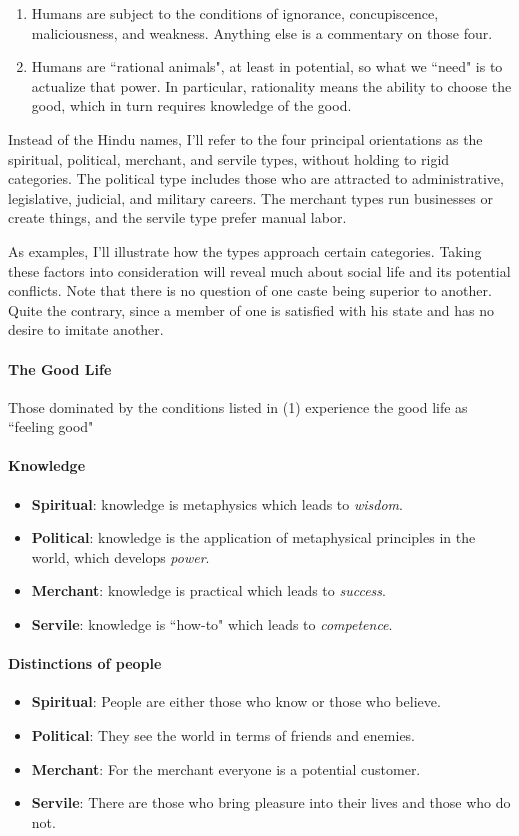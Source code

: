 \begin{enumerate}
\item Humans are subject to the conditions of ignorance, concupiscence, maliciousness, and weakness. Anything else is a commentary on those four. 
\item Humans are ``rational animals", at least in potential, so what we ``need" is to actualize that power. In particular, rationality means the ability to choose the good, which in turn requires knowledge of the good. 
\end{enumerate}
Instead of the Hindu names, I'll refer to the four principal orientations as the spiritual, political, merchant, and servile types, without holding to rigid categories. The political type includes those who are attracted to administrative, legislative, judicial, and military careers. The merchant types run businesses or create things, and the servile type prefer manual labor.

As examples, I'll illustrate how the types approach certain categories. Taking these factors into consideration will reveal much about social life and its potential conflicts. Note that there is no question of one caste being superior to another. Quite the contrary, since a member of one is satisfied with his state and has no desire to imitate another.

\paragraph{The Good Life}
Those dominated by the conditions listed in (1) experience the good life as ``feeling good"

\paragraph{Knowledge}
\begin{itemize}
\item \textbf{Spiritual}: knowledge is metaphysics which leads to \emph{wisdom}. 
\item \textbf{Political}: knowledge is the application of metaphysical principles in the world, which develops \emph{power}. 
\item \textbf{Merchant}: knowledge is practical which leads to \emph{success}. 
\item \textbf{Servile}: knowledge is ``how-to" which leads to \emph{competence}. 
\end{itemize}
\paragraph{Distinctions of people}
\begin{itemize}
\item \textbf{Spiritual}: People are either those who know or those who believe. 
\item \textbf{Political}: They see the world in terms of friends and enemies. 
\item \textbf{Merchant}: For the merchant everyone is a potential customer. 
\item \textbf{Servile}: There are those who bring pleasure into their lives and those who do not. 
\end{itemize}

